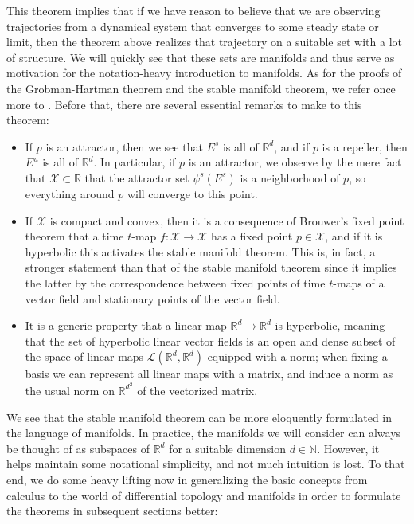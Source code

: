 \documentclass[11pt, a4paper]{memoir}
\theoremstyle{break}
\theoremstyle{break}
\theoremstyle{nonumberplain}
\newcommand{\mN}{\mathbb{N}}
\newcommand{\mR}{\mathbb{R}}
\begin{document}
This theorem implies that if we have reason to believe that we are observing trajectories from a dynamical system that converges to some steady state or limit, then the theorem above realizes that trajectory on a suitable set with a lot of structure. We will quickly see that these sets are manifolds and thus serve as motivation for the notation-heavy introduction to manifolds. As for the proofs of the Grobman-Hartman theorem and the stable manifold theorem, we refer once more to \cite{Dynamics}. Before that, there are several essential remarks to make to this theorem:
\begin{itemize}
	\item If $p$ is an attractor, then we see that $E^s$ is all of $\mR^d$, and if $p$ is a repeller, then $E^u$ is all of $\mR^d$. In particular, if $p$ is an attractor, we observe by the mere fact that $\mathcal{X}\subset \mR$ that the attractor set $\psi^s(E^s)$ is a neighborhood of $p$, so everything around $p$ will converge to this point. 
	\item If $\mathcal{X}$ is compact and convex, then it is a consequence of Brouwer's fixed point theorem that a time $t$-map $f:\mathcal{X}\to\mathcal{X}$ has a fixed point $p\in \mathcal{X}$, and if it is hyperbolic this activates the stable manifold theorem. This is, in fact, a stronger statement than that of the stable manifold theorem since it implies the latter by the correspondence between fixed points of time $t$-maps of a vector field and stationary points of the vector field.
	\item It is a generic property that a linear map $\mR^d\to\mR^d$ is hyperbolic, meaning that the set of hyperbolic linear vector fields is an open and dense subset of the space of linear maps $\mathcal{L}(\mR^d,\mR^d)$ equipped with a norm; when fixing a basis we can represent all linear maps with a matrix, and induce a norm as the usual norm on $\mR^{d^2}$ of the vectorized matrix.
\end{itemize}
We see that the stable manifold theorem can be more eloquently formulated in the language of manifolds. In practice, the manifolds we will consider can always be thought of as subspaces of $\mR^d$ for a suitable dimension $d\in \mN$. However, it helps maintain some notational simplicity, and not much intuition is lost. To that end, we do some heavy lifting now in generalizing the basic concepts from calculus to the world of differential topology and manifolds in order to formulate the theorems in subsequent sections better:
\end{document}
